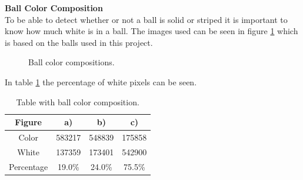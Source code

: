 

\textbf{Ball Color Composition}\\
To be able to detect whether or not a ball is solid or striped it is important to know how much white is in a ball. The images used can be seen in figure \ref{fig:ballscompo} which is based on the balls used in this project.

\begin{figure}[H]
\centering
{}

\caption{Ball color compositions.}
\label{fig:ballscompo}
\end{figure}

In table \ref{fig:ballscompotable} the percentage of white pixels can be seen.\\


\begin{table}[H]
\centering
\begin{tabular}{|c|c|c|c|}
	\hline Figure & a) & b) & c) \\ 
	\hline Color & 583217 & 548839 & 175858 \\ 
	\hline White & 137359 & 173401 & 542900 \\ 
	\hline Percentage & 19.0\% & 24.0\% & 75.5\% \\ 
	\hline
\end{tabular}
\caption{Table with ball color composition.}
\label{fig:ballscompotable}
\end{table}

